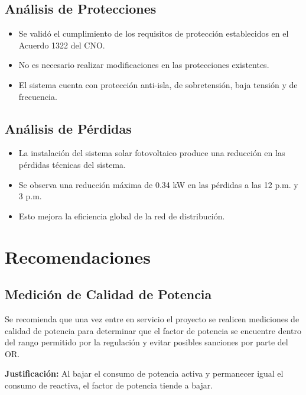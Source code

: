 \subsection{Análisis de Protecciones}

\begin{itemize}
    \item Se validó el cumplimiento de los requisitos de protección establecidos en el Acuerdo 1322 del CNO.
    
    \item No es necesario realizar modificaciones en las protecciones existentes.
    
    \item El sistema cuenta con protección anti-isla, de sobretensión, baja tensión y de frecuencia.
\end{itemize}

\subsection{Análisis de Pérdidas}

\begin{itemize}
    \item La instalación del sistema solar fotovoltaico produce una reducción en las pérdidas técnicas del sistema.
    
    \item Se observa una reducción máxima de 0.34 kW en las pérdidas a las 12 p.m. y 3 p.m.
    
    \item Esto mejora la eficiencia global de la red de distribución.
\end{itemize}

\section{Recomendaciones}

\subsection{Medición de Calidad de Potencia}

Se recomienda que una vez entre en servicio el proyecto se realicen mediciones de calidad de potencia para determinar que el factor de potencia se encuentre dentro del rango permitido por la regulación y evitar posibles sanciones por parte del OR.

\textbf{Justificación:} Al bajar el consumo de potencia activa y permanecer igual el consumo de reactiva, el factor de potencia tiende a bajar.

